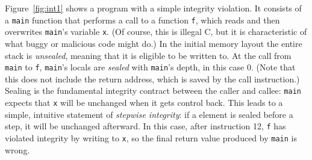 \documentclass[10pt,conference]{ieeetran}%
\theoremstyle{definition}
\begin{document}
Figure~\ref{fig:int1} shows a program with a simple integrity violation. It consists of a {\tt main}
function that performs a call to a function {\tt f}, which reads and then overwrites {\tt main}'s
variable {\tt x}. (Of course, this is illegal C, but it is characteristic of what buggy or malicious code might do.)
In the initial memory layout the entire stack is {\em unsealed},
meaning that it is eligible to be written to. At the call from {\tt main} to
{\tt f}, {\tt main}'s locals are {\em sealed} with {\tt main}'s depth,
in this case 0. (Note that this does not include the return address, which is saved
by the call instruction.)
Sealing is the fundamental integrity contract between the caller and callee:
{\tt main} expects that {\tt x} will be unchanged when it gets control back.
This leads to a simple, intuitive statement of {\em stepwise integrity}:
if a element is sealed before a step, it will be unchanged afterward.
In this case, after instruction 12, {\tt f} has violated integrity by writing to {\tt x},
so the final return value produced by {\tt main} is wrong.
\end{document}
